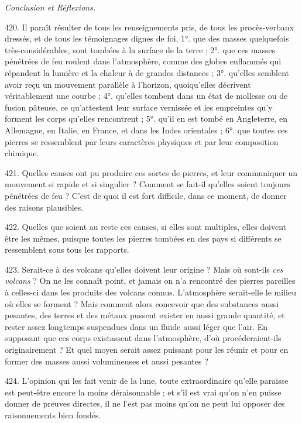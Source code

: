 \documentclass[a4paper, 11pt, oneside, polutonikogreek, french]{article}
\begin{document}
\emph{Conclusion et Réflexions.}

420. Il paraît résulter de tous les renseignements pris, de tous les procès-verbaux dressés, et de tous les témoignages dignes de foi, 1°. que des masses quelquefois très-considérables, sont tombées à la surface de la terre ; 2°. que ces masses pénétrées de feu roulent dans l'atmosphère, comme des globes enflammés qui répandent la lumière et la chaleur à de grandes distances ; 3°. qu'elles semblent avoir reçu un mouvement parallèle à l'horizon, quoiqu'elles décrivent véritablement une courbe ; 4°. qu'elles tombent dans un état de mollesse ou de fusion pâteuse, ce qu'attestent leur surface vernissée et les empreintes qu'y forment les corps qu'elles rencontrent ; 5°. qu'il en est tombé en Angleterre, en Allemagne, en Italie, en France, et dans les Indes orientales ; 6°. que toutes ces pierres se ressemblent par leurs caractères physiques et par leur composition chimique.

421. Quelles causes ont pu produire ces sortes de pierres, et leur communiquer un mouvement si rapide et si singulier ? Comment se fait-il qu'elles soient toujours pénétrées de feu ? C'est de quoi il est fort difficile, dans ce moment, de donner des raisons plausibles.

422. Quelles que soient au reste ces causes, si elles sont multiples, elles doivent être les mêmes, puisque toutes les pierres tombées en des pays si différents se ressemblent sous tous les rapports.

423. Serait-ce à des volcans qu'elles doivent leur origine ? Mais où sont-ils \emph{ces volcans} ? On ne les connaît point, et jamais on n'a rencontré des pierres pareilles à celles-ci dans les produits des volcans connus. L'atmosphère serait-elle le milieu où elles se forment ? Mais comment alors concevoir que des substances aussi pesantes, des terres et des métaux pussent exister en aussi grande quantité, et rester assez longtemps suspendues dans un fluide aussi léger que l'air. En supposant que ces corps existassent dans l'atmosphère, d'où procéderaient-ils originairement ? Et quel moyen serait assez puissant pour les réunir et pour en former des masses aussi volumineuses et aussi pesantes ?

424. L'opinion qui les fait venir de la lune, toute extraordinaire qu'elle paraisse est peut-être encore la moins déraisonnable ; et s'il est vrai qu'on n'en puisse donner de preuves directes, il ne l'est pas moins qu'on ne peut lui opposer des raisonnements bien fondés.
\end{document}
